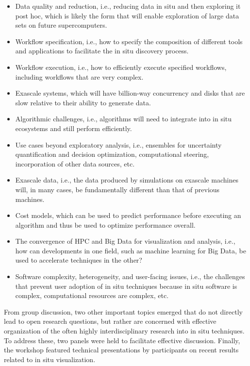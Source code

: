 \begin{itemize}
    \item Data quality and reduction, i.e., reducing data in situ and then exploring it post hoc, which is likely the form that will enable exploration of large data sets on future supercomputers.
    \item Workflow specification, i.e., how to specify the composition of different tools and applications to facilitate the in situ discovery process.
    \item Workflow execution, i.e., how to efficiently execute specified workflows, including workflows that are very complex.
    \item Exascale systems, which will have billion-way concurrency and disks that are slow relative to their ability to generate data.
    \item Algorithmic challenges, i.e., algorithms will need to integrate into in situ ecosystems and still perform efficiently.
    \item Use cases beyond exploratory analysis, i.e., ensembles for uncertainty quantification and decision optimization, computational steering, incorporation of other data sources, etc.
    \item Exascale data, i.e., the data produced by simulations on exascale machines will, in many cases, be fundamentally different than that of previous machines.
    \item Cost models, which can be used to predict performance before executing an algorithm and thus be used to optimize performance overall.
    \item The convergence of HPC and Big Data for visualization and analysis, i.e., how can developments in one field, such as machine learning for Big Data, be used to accelerate techniques in the other?
    \item Software complexity, heterogeneity, and user-facing issues, i.e., the challenges that prevent user adoption of in situ techniques because in situ software is complex, computational resources are complex, etc.
\end{itemize}

\noindent
From group discussion, two other important topics emerged that do not directly lead to open research questions, but rather are concerned with effective organization of the often highly interdisciplinary research into in situ techniques. To address these, two panels were held to facilitate effective discussion. Finally, the workshop featured technical presentations by participants on recent results related to in situ visualization.